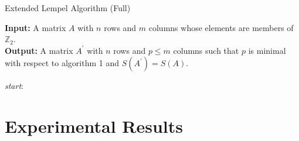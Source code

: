 \documentclass{article}
\theoremstyle{definition}
\theoremstyle{problem}
\theoremstyle{lemma}
\begin{document}
		\begin{algorithm}
			\caption{Extended Lempel Algorithm (Full)}
			\label{alg_full}
			\textbf{Input:} A matrix $A$ with $n$ rows and $m$ columns whose elements are members of $\mathbb{Z}_2$.\\
			\textbf{Output:} A matrix $A^\prime$ with $n$ rows and $p \leq m$ columns such that $p$ is minimal with respect to algorithm 1 and $S(A^\prime) = S(A)$.
			\begin{algorithmic}[1]
				\BState \emph{start}:
				\Else
				\EndIf
				\EndProcedure
			\end{algorithmic}
		\end{algorithm}
			
				
				
				
				
				
				
				
			
			\section{Experimental Results}			
			
			\label{s5_Results}
\end{document}
